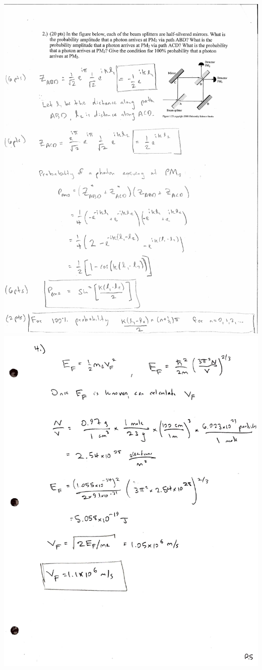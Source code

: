 \documentclass[0pt]{report}
\begin{document}
\begin{multicols*}{3}
\begin{flushleft}
\includegraphics[scale=.31]{exam12.pdf}
\includegraphics[scale=.31]{exam13.pdf}

\end{flushleft}
\end{multicols*}
\end{document}
